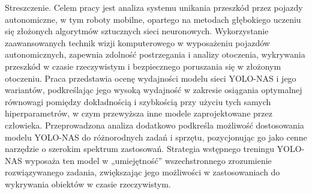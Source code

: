Streszczenie. Celem pracy jest analiza systemu unikania przeszkód przez pojazdy autonomiczne, w tym roboty mobilne, opartego na metodach głębokiego uczeniu się złożonych algorytmów sztucznych sieci neuronowych. Wykorzystanie zaawansowanych technik wizji komputerowego w wyposażeniu pojazdów autonomicznych, zapewnia zdolność postrzegania i analizy otoczenia, wykrywania przeszkód w czasie rzeczywistym i bezpiecznego poruszania się w złożonym otoczeniu. Praca przedstawia ocenę wydajności modelu sieci YOLO-NAS i jego wariantów, podkreślając jego wysoką wydajność w zakresie osiągania optymalnej równowagi pomiędzy dokładnością i szybkością przy użyciu tych samych hiperparametrów, w czym przewyższa inne modele zaprojektowane przez człowieka. Przeprowadzona analiza dodatkowo podkreśla możliwość dostosowania modelu YOLO-NAS do różnorodnych zadań i sprzętu, pozycjonując go jako cenne narzędzie o szerokim spektrum zastosowań. Strategia wstępnego treningu YOLO-NAS wyposaża ten model w „umiejętność” wszechstronnego zrozumienie rozwiązywanego zadania, zwiększając jego możliwości w zastosowaniach do wykrywania obiektów w czasie rzeczywistym.
